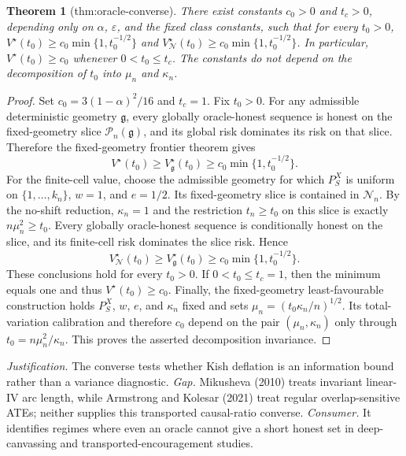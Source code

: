 \documentclass{article}
\newtheorem{theorem}{Theorem}
\begin{document}
\begin{theorem}[thm:oracle-converse]\label{thm:oracle-converse}
There exist constants \(c_0>0\) and \(t_c>0\), depending only on \(\alpha\), \(\varepsilon\), and the fixed class constants, such that for every \(t_0>0\), \(V^\star(t_0)\ge c_0\min\{1,t_0^{-1/2}\}\) and \(V_{\mathcal N}^\star(t_0)\ge c_0\min\{1,t_0^{-1/2}\}\). In particular, \(V^\star(t_0)\ge c_0\) whenever \(0<t_0\le t_c\). The constants do not depend on the decomposition of \(t_0\) into \(\mu_n\) and \(\kappa_n\).
\end{theorem}
\begin{proof}
Set \(c_0=3(1-\alpha)^2/16\) and \(t_c=1\). Fix \(t_0>0\). For any admissible deterministic geometry \(\mathfrak g\), every globally oracle-honest sequence is honest on the fixed-geometry slice \(\mathcal P_n(\mathfrak g)\), and its global risk dominates its risk on that slice. Therefore the fixed-geometry frontier theorem gives
\[
 V^\star(t_0)\ge V_{\mathfrak g}^\star(t_0)
 \ge c_0\min\{1,t_0^{-1/2}\}.
\]
For the finite-cell value, choose the admissible geometry for which \(P_S^X\) is uniform on \(\{1,\ldots,k_n\}\), \(w=1\), and \(e=1/2\). Its fixed-geometry slice is contained in \(\mathcal N_n\). By the no-shift reduction, \(\kappa_n=1\) and the restriction \(t_n\ge t_0\) on this slice is exactly \(n\mu_n^2\ge t_0\). Every globally oracle-honest sequence is conditionally honest on the slice, and its finite-cell risk dominates the slice risk. Hence
\[
 V_{\mathcal N}^\star(t_0)
 \ge V_{\mathfrak g}^\star(t_0)
 \ge c_0\min\{1,t_0^{-1/2}\}.
\]
These conclusions hold for every \(t_0>0\). If \(0<t_0\le t_c=1\), then the minimum equals one and thus \(V^\star(t_0)\ge c_0\). Finally, the fixed-geometry least-favourable construction holds \(P_S^X\), \(w\), \(e\), and \(\kappa_n\) fixed and sets \(\mu_n=(t_0\kappa_n/n)^{1/2}\). Its total-variation calibration and therefore \(c_0\) depend on the pair \((\mu_n,\kappa_n)\) only through \(t_0=n\mu_n^2/\kappa_n\). This proves the asserted decomposition invariance.
\end{proof}
\par\smallskip\noindent \textit{Justification.} The converse tests whether Kish deflation is an information bound rather than a variance diagnostic. \textit{Gap.} Mikusheva (2010) treats invariant linear-IV arc length, while Armstrong and Kolesar (2021) treat regular overlap-sensitive ATEs; neither supplies this transported causal-ratio converse. \textit{Consumer.} It identifies regimes where even an oracle cannot give a short honest set in deep-canvassing and transported-encouragement studies.
\end{document}
